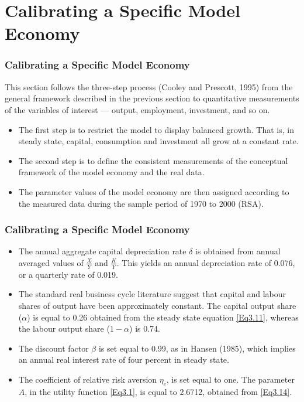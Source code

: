 \documentclass[handout]{beamer}
\begin{document}
\section{Calibrating a Specific Model Economy}

\begin{frame}

\frametitle{Calibrating a Specific Model Economy}\vskip 0.1in

This section follows the three-step process (Cooley and Prescott,
1995) from the general framework described in the previous section
to quantitative measurements of the variables of interest ---
output, employment, investment, and so on.

\begin{itemize}
\item The first step is to restrict the model to display balanced
growth. That is, in steady state, capital, consumption and investment
all grow at a constant rate.\\
\item The second step is to define the
consistent measurements of the conceptual framework of the model
economy and the real data.\\
\item The parameter values of the model economy are then assigned
according to the measured data during the sample period of 1970 to
2000 (RSA).
\end{itemize}
\end{frame}


\begin{frame}

\frametitle{Calibrating a Specific Model Economy}\vskip 0.1in

\begin{itemize}
\item The annual aggregate capital depreciation rate $\delta$ is
obtained from annual averaged values of $\frac{X}{Y}$ and
$\frac{K}{Y}$. This yields an annual depreciation rate of 0.076, or
a quarterly rate of 0.019.\\
\item The standard real business cycle literature suggest that capital
and labour shares of output have been approximately constant. The
capital output share ($\alpha$) is equal to 0.26 obtained from the
steady state equation \eqref{Eq3.11}, whereas the labour output share
($1-\alpha$) is 0.74.\\
\item The discount factor $\beta$ is set equal to 0.99, as in Hansen
(1985), which implies an annual real interest rate of four percent
in steady state.\\
\item The coefficient of relative risk aversion $\eta_{c}$, is set
equal to one. The parameter $A$, in the utility function
\eqref{Eq3.1}, is equal to 2.6712, obtained from \eqref{Eq3.14}.
\end{itemize}
\end{frame}
\end{document}
